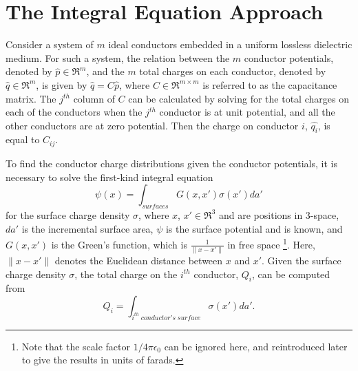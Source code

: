 \section{The Integral Equation Approach}

Consider a system of $ m $ ideal conductors embedded in a uniform
lossless dielectric medium.  For such a system, the relation between
the $ m $ conductor potentials, denoted by $ \hat{p} \in \Re^m $, and
the $ m $ total charges on each conductor, denoted by $ \hat{q} \in
\Re^m $, is given by $ \hat{q} = C \hat{p} $, where $ C \in
\Re^{m\times m} $ is referred to as the capacitance matrix. The 
$ j^{th} $ column of $ C $ can be calculated by solving for the total
charges on each of the conductors when the $ j^{th} $ conductor is at
unit potential, and all the other conductors are at zero potential.
Then the charge on conductor $ i $, $ \hat{q_i} $, is equal to $
C_{ij} $.

To find the conductor charge distributions given the conductor potentials,
it is necessary to solve the first-kind integral equation 
\begin{equation}
\psi (x) = \int_{  sur\!f\!aces } G(x,x') \sigma (x') da'
\label{eq:integral}
\end{equation}
for the surface charge density $ \sigma $, where $ x$, $x' \in \Re^3 $
and are positions in 3-space,
$ da' $ is the incremental surface area, $ \psi $ is the
surface potential and is known, and $ G(x,x') $ is the
Green's function, which is 
$ \frac{1}{\| x - x' \| } $ in free space
\newcommand{\integfoot}{Note that the scale factor 
$1/4\pi\epsilon_0$ can be ignored here, and
reintroduced later to give the results in units of farads.}
\footnote{\integfoot}.
Here, $ \| x - x' \| $ denotes the Euclidean distance between $ x $ 
and $ x' $.
Given the surface charge density $ \sigma $, the total charge
on the $ i^{th} $ conductor, $ Q_i $, can be computed from
\begin{equation}
Q_i = \int_{i^{th}\; conductor's\; sur\!f\!ace } \sigma (x') da'.
\end{equation}

